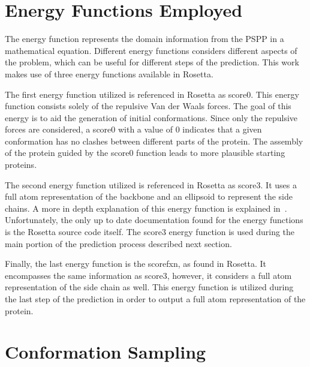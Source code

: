 \section{Energy Functions Employed}
\label{sec:energy-function}

The energy function represents the domain information from the \ac{PSPP} in a
mathematical equation. Different energy functions considers different aspects
of the problem, which can be useful for different steps of the prediction. This
work makes use of three energy functions available in Rosetta.

The first energy function utilized is referenced in Rosetta as score0. This
energy function consists solely of the repulsive Van der Waals forces. The goal
of this energy is to aid the generation of initial conformations. Since only
the repulsive forces are considered, a score0 with a value of $0$ indicates
that a given conformation has no clashes between different parts of the
protein. The assembly of the protein guided by the score0 function leads to
more plausible starting proteins.

The second energy function utilized is referenced in Rosetta as score3. It uses
a full atom representation of the backbone and an ellipsoid to represent the
side chains. A more in depth explanation of this energy function is explained
in~\cite{alford2017rosetta}. Unfortunately, the only up to date documentation
found for the energy functions is the Rosetta source code itself.  The score3
energy function is used during the main portion of the prediction process
described next section.

Finally, the last energy function is the scorefxn, as found in Rosetta. It
encompasses the same information as score3, however, it considers a full atom
representation of the side chain as well. This energy function is utilized
during the last step of the prediction in order to output a full atom
representation of the protein.

\section{Conformation Sampling}
\label{sec:conformation-sampling}

